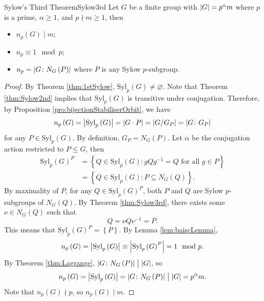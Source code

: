 \documentclass[math]{amznotes}
\theoremstyle{remark}
\newcommand{\0}{\mathbf{0}}
\newcommand{\1}{\mathbf{1}}
\begin{document}
\begin{thmbox}{Sylow's Third Theorem}{Sylow3rd}
    Let $G$ be a finite group with ${\left\lvert {G} \right\rvert} = p^{\alpha}m$ where $p$ is a prime, $\alpha \geq 1$, and $p \nmid m \geq 1$, then 
    \begin{itemize}
        \item $n_p\left(G\right) \mid m$;
        \item $n_p \equiv 1 \mod p$;
        \item $n_p = {\left\lvert {G \colon N_G\left(P\right)} \right\rvert}$ where $P$ is any Sylow $p$-subgroup.
    \end{itemize}
    \tcblower
    \begin{proof}
        By Theorem \ref{thm:1stSylow}, $\mathrm{Syl}_p\left(G\right) \neq \varnothing$. Note that Theorem \ref{thm:Sylow2nd} implies that $\mathrm{Syl}_p\left(G\right)$ is transitive under conjugation. Therefore, by Proposition \ref{pro:bijectionStabiliserOrbit}, we have 
        \begin{equation*}
            n_p\left(G\right) = {\left\lvert {\mathrm{Syl}_p\left(G\right)} \right\rvert} = {\left\lvert {G \cdot P} \right\rvert} = {\left\lvert {G \slash G_P} \right\rvert} = {\left\lvert {G \colon G_P} \right\rvert}
        \end{equation*}
        for any $P \in \mathrm{Syl}_p\left(G\right)$. By definition, $G_P = N_G\left(P\right)$. Let $\alpha$ be the conjugation action restricted to $P \leq G$, then 
        \begin{align*}
            \mathrm{Syl}_p\left(G\right)^P & = \left\{Q \in \mathrm{Syl}_p\left(G\right) \colon gQg^{-1} = Q \textrm{ for all } g \in P\right\} \\
            & = \left\{Q \in \mathrm{Syl}_p\left(G\right) \colon P \subseteq N_G\left(Q\right)\right\}.
        \end{align*}
        By maximality of $P$, for any $Q \in \mathrm{Syl}_p\left(G\right)^P$, both $P$ and $Q$ are Sylow $p$-subgroups of $N_G\left(Q\right)$. By Theorem \ref{thm:Sylow3rd}, there exists some $\nu \in N_G\left(Q\right)$ such that 
        \begin{equation*}
            Q = \nu Q \nu^{-1} = P.
        \end{equation*}
        This means that $\mathrm{Syl}_p\left(G\right)^P = \left\{P\right\}$. By Lemma \ref{lem:baiscLemma}, 
        \begin{equation*}
            n_p\left(G\right) = {\left\lvert {\mathrm{Syl}_p\left(G\right)} \right\rvert} \equiv {\left\lvert {\mathrm{Syl}_p\left(G\right)^P} \right\rvert} = 1 \mod p.
        \end{equation*}
        By Theorem \ref{thm:Lagrange}, ${\left\lvert {G \colon N_G\left(P\right)} \right\rvert} \bigm\vert {\left\lvert {G} \right\rvert}$, so 
        \begin{equation*}
            n_p\left(G\right) = {\left\lvert {\mathrm{Syl}_p\left(G\right)} \right\rvert} = {\left\lvert {G \colon N_G\left(P\right)} \right\rvert} \bigm\vert {\left\lvert {G} \right\rvert} = p^{\alpha}m.
        \end{equation*}
        Note that $n_p\left(G\right) \nmid p$, so $n_p\left(G\right) \mid m$.
    \end{proof}
\end{thmbox}
\end{document}
